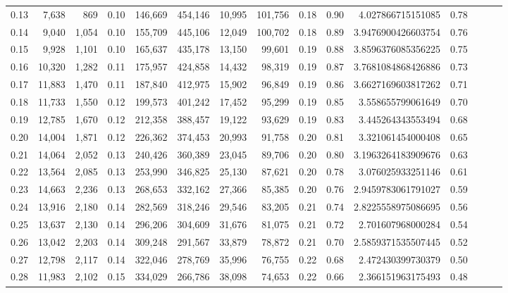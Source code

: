 \begin{tabular}{rrrrrrrrrrrrrrr}
0.13 &   7,638 &    869 &  0.10 &  146,669 &  454,146 &   10,995 &  101,756 &  0.18 &  0.90 &     4.027866715151085 &      0.78 \\
0.14 &   9,040 &  1,054 &  0.10 &  155,709 &  445,106 &   12,049 &  100,702 &  0.18 &  0.89 &    3.9476900426603754 &      0.76 \\
0.15 &   9,928 &  1,101 &  0.10 &  165,637 &  435,178 &   13,150 &   99,601 &  0.19 &  0.88 &    3.8596376085356225 &      0.75 \\
0.16 &  10,320 &  1,282 &  0.11 &  175,957 &  424,858 &   14,432 &   98,319 &  0.19 &  0.87 &    3.7681084868426886 &      0.73 \\
0.17 &  11,883 &  1,470 &  0.11 &  187,840 &  412,975 &   15,902 &   96,849 &  0.19 &  0.86 &    3.6627169603817262 &      0.71 \\
0.18 &  11,733 &  1,550 &  0.12 &  199,573 &  401,242 &   17,452 &   95,299 &  0.19 &  0.85 &     3.558655799061649 &      0.70 \\
0.19 &  12,785 &  1,670 &  0.12 &  212,358 &  388,457 &   19,122 &   93,629 &  0.19 &  0.83 &     3.445264343553494 &      0.68 \\
0.20 &  14,004 &  1,871 &  0.12 &  226,362 &  374,453 &   20,993 &   91,758 &  0.20 &  0.81 &     3.321061454000408 &      0.65 \\
0.21 &  14,064 &  2,052 &  0.13 &  240,426 &  360,389 &   23,045 &   89,706 &  0.20 &  0.80 &    3.1963264183909676 &      0.63 \\
0.22 &  13,564 &  2,085 &  0.13 &  253,990 &  346,825 &   25,130 &   87,621 &  0.20 &  0.78 &     3.076025933251146 &      0.61 \\
0.23 &  14,663 &  2,236 &  0.13 &  268,653 &  332,162 &   27,366 &   85,385 &  0.20 &  0.76 &    2.9459783061791027 &      0.59 \\
0.24 &  13,916 &  2,180 &  0.14 &  282,569 &  318,246 &   29,546 &   83,205 &  0.21 &  0.74 &    2.8225558975086695 &      0.56 \\
0.25 &  13,637 &  2,130 &  0.14 &  296,206 &  304,609 &   31,676 &   81,075 &  0.21 &  0.72 &     2.701607968000284 &      0.54 \\
0.26 &  13,042 &  2,203 &  0.14 &  309,248 &  291,567 &   33,879 &   78,872 &  0.21 &  0.70 &    2.5859371535507445 &      0.52 \\
0.27 &  12,798 &  2,117 &  0.14 &  322,046 &  278,769 &   35,996 &   76,755 &  0.22 &  0.68 &     2.472430399730379 &      0.50 \\
0.28 &  11,983 &  2,102 &  0.15 &  334,029 &  266,786 &   38,098 &   74,653 &  0.22 &  0.66 &     2.366151963175493 &      0.48 \\

\end{tabular}
